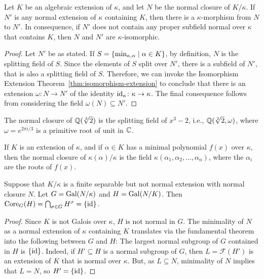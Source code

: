 \begin{cor}
    Let\/ $K$ be an algebraic extension of\/ $\kappa$, and let\/ $N$ be the normal closure of\/ $K / \kappa$. If\/ $N'$ is any normal extension of\/ $\kappa$ containing\/ $K$, then there is a\/ $\kappa$-morphism from\/ $N$ to\/ $N'$. In consequence, if\/ $N'$ does not contain any proper subfield normal over\/ $\kappa$ that contains\/ $K$, then\/ $N$ and\/ $N'$ are\/ $\kappa$-isomorphic.
\end{cor}

\begin{proof}
    Let $N'$ be as stated. If $S=\{\operatorname{min}_{\kappa,\alpha}\mid\alpha\in K\}$, by definition, $N$ is the splitting field of $S$. Since the elements of $S$ split over $N'$, there is a subfield of $N'$, that is also a splitting field of $S$. Therefore, we can invoke the Isomorphism Extension Theorem~\ref{thm:isomorphism-extension} to conclude that there is an extension $\omega\colon N\to N'$ of the identity $\operatorname{id}_\kappa\colon\kappa\to\kappa$. The final consequence follows from considering the field $\omega(N)\subseteq N'$.
\end{proof}

\begin{xmpl}
    The normal closure of $\mathbb{Q}(\sqrt[3]2)$ is the splitting field of $x^3-2$, i.e., $\mathbb{Q}(\sqrt[3]2,\omega)$, where $\omega=e^{2\pi i/3}$ is a primitive root of unit in $\mathbb{C}$.
\end{xmpl}

\begin{rem}
    If $K$ is an extension of $\kappa$, and if $\alpha \in K$ has a minimal polynomial $f(x)$ over $\kappa$, then the normal closure of $\kappa(\alpha) / \kappa$ is the field $\kappa(\alpha_1, \alpha_2, \dots, \alpha_n)$, where the $\alpha_i$ are the roots of $f(x)$.
\end{rem}

\begin{prop}
    Suppose that\/ $K / \kappa$ is a finite separable but not normal extension with normal closure\/ $N$. Let\/ $G = \operatorname{Gal}(N / \kappa)$ and\/ $H = \operatorname{Gal}(N / K)$. Then\/ $\operatorname{Core}_G(H)=\bigcap_{\sigma \in G} H^\sigma = \{\operatorname{id}\}$.
\end{prop}

\begin{proof}
    Since $K$ is not Galois over $\kappa$, $H$ is not normal in $G$. The minimality of $N$ as a normal extension of $\kappa$ containing $K$ translates via the fundamental theorem into the following between $G$ and $H$: The largest normal subgroup of $G$ contained in $H$ is $\{\operatorname{id}\}$. Indeed, if $H' \subseteq H$ is a normal subgroup of $G$, then $L = \mathcal F(H')$ is an extension of $K$ that is normal over $\kappa$. But, as $L \subseteq N$, minimality of $N$ implies that $L = N$, so $H' = \{\operatorname{id}\}$.
\end{proof}


